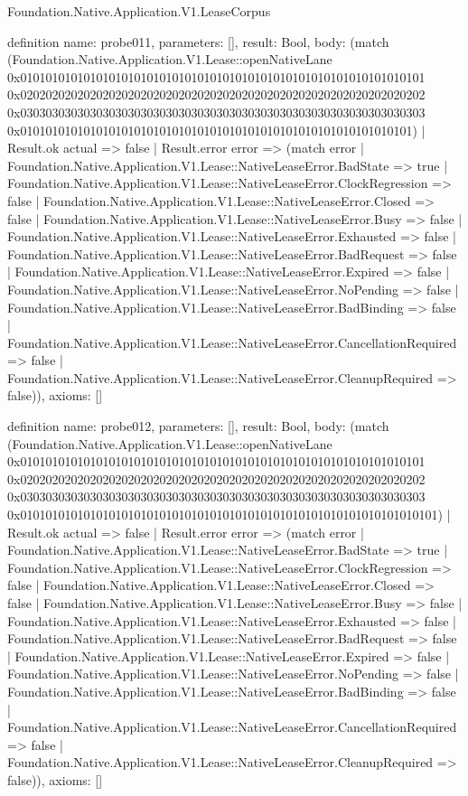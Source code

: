 \begin{lexlean}{Foundation.Native.Application.V1.LeaseCorpus}
\begin{semanticmodule}
definition{
  name: probe011,
  parameters: [],
  result: Bool,
  body: (match (Foundation.Native.Application.V1.Lease::openNativeLane 0x0101010101010101010101010101010101010101010101010101010101010101 0x0202020202020202020202020202020202020202020202020202020202020202 0x0303030303030303030303030303030303030303030303030303030303030303 0x01010101010101010101010101010101010101010101010101010101010101)
    | Result.ok actual => false
    | Result.error error => (match error
      | Foundation.Native.Application.V1.Lease::NativeLeaseError.BadState => true
      | Foundation.Native.Application.V1.Lease::NativeLeaseError.ClockRegression => false
      | Foundation.Native.Application.V1.Lease::NativeLeaseError.Closed => false
      | Foundation.Native.Application.V1.Lease::NativeLeaseError.Busy => false
      | Foundation.Native.Application.V1.Lease::NativeLeaseError.Exhausted => false
      | Foundation.Native.Application.V1.Lease::NativeLeaseError.BadRequest => false
      | Foundation.Native.Application.V1.Lease::NativeLeaseError.Expired => false
      | Foundation.Native.Application.V1.Lease::NativeLeaseError.NoPending => false
      | Foundation.Native.Application.V1.Lease::NativeLeaseError.BadBinding => false
      | Foundation.Native.Application.V1.Lease::NativeLeaseError.CancellationRequired => false
      | Foundation.Native.Application.V1.Lease::NativeLeaseError.CleanupRequired => false)),
  axioms: []
}

definition{
  name: probe012,
  parameters: [],
  result: Bool,
  body: (match (Foundation.Native.Application.V1.Lease::openNativeLane 0x0101010101010101010101010101010101010101010101010101010101010101 0x0202020202020202020202020202020202020202020202020202020202020202 0x0303030303030303030303030303030303030303030303030303030303030303 0x010101010101010101010101010101010101010101010101010101010101010101)
    | Result.ok actual => false
    | Result.error error => (match error
      | Foundation.Native.Application.V1.Lease::NativeLeaseError.BadState => true
      | Foundation.Native.Application.V1.Lease::NativeLeaseError.ClockRegression => false
      | Foundation.Native.Application.V1.Lease::NativeLeaseError.Closed => false
      | Foundation.Native.Application.V1.Lease::NativeLeaseError.Busy => false
      | Foundation.Native.Application.V1.Lease::NativeLeaseError.Exhausted => false
      | Foundation.Native.Application.V1.Lease::NativeLeaseError.BadRequest => false
      | Foundation.Native.Application.V1.Lease::NativeLeaseError.Expired => false
      | Foundation.Native.Application.V1.Lease::NativeLeaseError.NoPending => false
      | Foundation.Native.Application.V1.Lease::NativeLeaseError.BadBinding => false
      | Foundation.Native.Application.V1.Lease::NativeLeaseError.CancellationRequired => false
      | Foundation.Native.Application.V1.Lease::NativeLeaseError.CleanupRequired => false)),
  axioms: []
}


\end{semanticmodule}
\end{lexlean}
